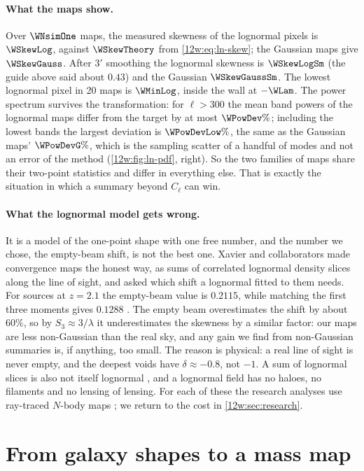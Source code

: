 \paragraph{What the maps show.} Over $\WNsimOne$ maps, the measured skewness of the lognormal pixels is
$\WSkewLog$, against $\WSkewTheory$ from \eqref{12w:eq:ln-skew}; the Gaussian maps give $\WSkewGauss$. After
$3'$ smoothing the lognormal skewness is $\WSkewLogSm$ (the guide above said about $0.43$) and the Gaussian
$\WSkewGaussSm$. The lowest lognormal pixel in 20 maps is $\WMinLog$, inside the wall at $-\WLam$. The power spectrum
survives the transformation: for $\ell>300$ the mean band powers of the lognormal maps differ from the target by at
most $\WPowDev\%$; including the lowest bands the largest deviation is $\WPowDevLow\%$, the same as the Gaussian
maps' $\WPowDevG\%$, which is the sampling scatter of a handful of modes and not an error of the method
(\cref{12w:fig:ln-pdf}, right). So the two families of maps share their two-point statistics and differ in
everything else. That is exactly the situation in which a summary beyond $C_\ell$ can win.

\paragraph{What the lognormal model gets wrong.} It is a model of the one-point shape with one free number, and the
number we chose, the empty-beam shift, is not the best one. Xavier and collaborators made convergence maps the
honest way, as sums of correlated lognormal density slices along the line of sight, and asked which shift a
lognormal fitted to them needs. For sources at $z=2.1$ the empty-beam value is $0.2115$, while matching the
first three moments gives $0.1288$ \cite[Table~2]{Xavier2016}. The empty beam overestimates the shift by about
$60\%$, so by $S_3\approx3/\lambda$ it underestimates the skewness by a similar factor: our maps are less
non-Gaussian than the real sky, and any gain we find from non-Gaussian summaries is, if anything, too small. The
reason is physical: a real line of sight is never empty, and the deepest voids have $\delta\approx-0.8$, not $-1$.
A sum of lognormal slices is also not itself lognormal \cite[§3.3]{Xavier2016}, and a lognormal field has no
haloes, no filaments and no lensing of lensing. For each of these the research analyses use ray-traced $N$-body
maps \cite{Takahashi2017sims}; we return to the cost in \cref{12w:sec:research}.
\section{From galaxy shapes to a mass map}
\label{12w:sec:ks}

